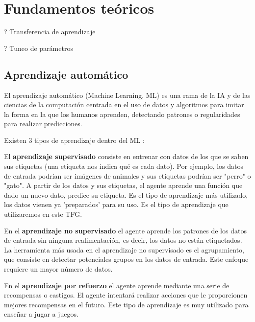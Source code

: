 \chapter{Fundamentos teóricos}
\thispagestyle{empty}

? Transferencia de aprendizaje

? Tuneo de parámetros

\section{Aprendizaje automático}
El aprendizaje automático (Machine Learning, ML) \cite{16,17} es una rama de la IA y de las ciencias de la computación centrada en el uso de datos y algoritmos para imitar la forma en la que los humanos aprenden, detectando patrones o regularidades para realizar predicciones.

Existen 3 tipos de aprendizaje dentro del ML \cite{18,19}:

El \textbf{aprendizaje supervisado} consiste en entrenar con datos de los que se saben sus etiquetas (una etiqueta nos indica qué es cada dato). Por ejemplo, los datos de entrada podrían ser imágenes de animales y sus etiquetas podrían ser "perro" o "gato". A partir de los datos y sus etiquetas, el agente aprende una función que dado un nuevo dato, predice su etiqueta. Es el tipo de aprendizaje más utilizado, los datos vienen ya 'preparados' para su uso. Es el tipo de aprendizaje que utilizaremos en este TFG.

En el \textbf{aprendizaje no supervisado} el agente aprende los patrones de los datos de entrada sin ninguna realimentación, es decir, los datos no están etiquetados. La herramienta más usada en el aprendizaje no supervisado es el agrupamiento, que consiste en detectar potenciales grupos en los datos de entrada. Este enfoque requiere un mayor número de datos.

En el \textbf{aprendizaje por refuerzo} el agente aprende mediante una serie de recompensas o castigos. El agente intentará realizar acciones que le proporcionen mejores recompensas en el futuro. Este tipo de aprendizaje es muy utilizado para enseñar a jugar a juegos.

